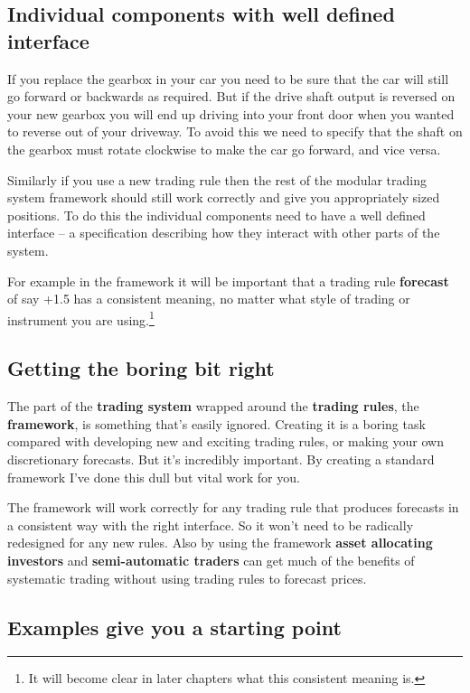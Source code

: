 \subsection*{Individual components with well defined interface}

If you replace the gearbox in your car you need to be sure that the car will still go forward or backwards as required. But if the drive shaft output is reversed on your new gearbox you will end up driving into your front door when you wanted to reverse out of your driveway. To avoid this we need to specify that the shaft on the gearbox must rotate clockwise to make the car go forward, and vice versa.

Similarly if you use a new trading rule then the rest of the modular trading system framework should still work correctly and give you appropriately sized positions. To do this the individual components need to have a well defined interface -- a specification describing how they interact with other parts of the system.

For example in the framework it will be important that a trading rule \textbf{forecast} of say +1.5 has a consistent meaning, no matter what style of trading or instrument you are using.\footnote{It will become clear in later chapters what this consistent meaning is.}

\subsection*{Getting the boring bit right}

The part of the \textbf{trading system} wrapped around the \textbf{trading rules}, the \textbf{framework}, is something that's easily ignored. Creating it is a boring task compared with developing new and exciting trading rules, or making your own discretionary forecasts. But it's incredibly important. By creating a standard framework I've done this dull but vital work for you.

The framework will work correctly for any trading rule that produces forecasts in a consistent way with the right interface. So it won't need to be radically redesigned for any new rules. Also by using the framework \textbf{asset allocating investors} and \textbf{semi-automatic traders} can get much of the benefits of systematic trading without using trading rules to forecast prices.

\subsection*{Examples give you a starting point}

